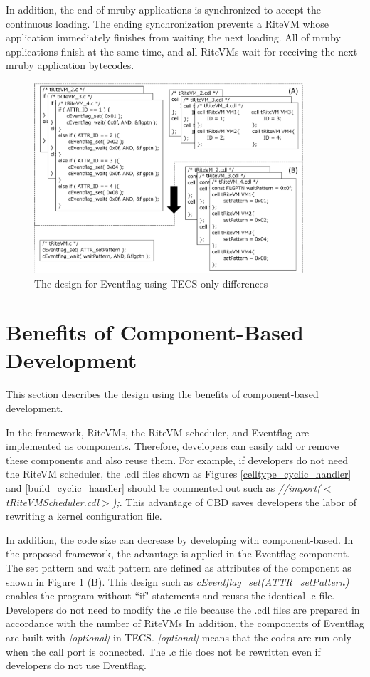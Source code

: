 \documentclass[a4j,12pt,oneside,openany,english]{jsbook}
\begin{document}
In addition, the end of mruby applications is synchronized to accept the continuous loading.
The ending synchronization prevents a RiteVM whose application immediately finishes from waiting the next loading.
All of mruby applications finish at the same time, and all RiteVMs wait for receiving the next mruby application bytecodes. 

\begin{figure}[t]
    \centering
    \includegraphics[width=10cm,clip]{../EMSOFT2016/figure/Eventflag.pdf}
    \caption{The design for Eventflag using TECS {\scriptsize *only differences}}
    \label{fig:Eventflag}
\end{figure}
 
\section{Benefits of Component-Based Development}
This section describes the design using the benefits of component-based development.

In the framework, RiteVMs, the RiteVM scheduler, and Eventflag are implemented as components.
Therefore, developers can easily add or remove these components and also reuse them.
For example, if developers do not need the RiteVM scheduler, the .cdl files shown as Figures \ref{celltype_cyclic_handler} and \ref{build_cyclic_handler} should be commented out such as {\it //import($<$tRiteVMScheduler.cdl$>$);}.
This advantage of CBD saves developers the labor of rewriting a kernel configuration file.

In addition, the code size can decrease by developing with component-based. 
In the proposed framework, the advantage is applied in the Eventflag component.
The set pattern and wait pattern are defined as attributes of the component as shown in Figure \ref{fig:Eventflag} (B).
This design such as {\it cEventflag\_set(ATTR\_setPattern)} enables the program without ``if" statements and reuses the identical .c file.
Developers do not need to modify the .c file because the .cdl files are prepared in accordance with the number of RiteVMs
In addition, the components of Eventflag are built with {\it [optional]} in TECS.
{\it [optional]} means that the codes are run only when the call port is connected.
The .c file does not be rewritten even if developers do not use Eventflag. 
\end{document}

